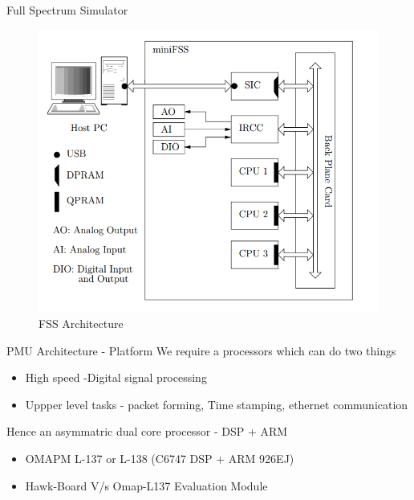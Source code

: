 \documentclass{beamer}
\begin{document}
\begin{frame}{Full Spectrum Simulator}
\begin{figure}
\includegraphics[scale=0.3]{fig/fss_arch2.png}
\caption{FSS Architecture}
\end{figure}
\end{frame}

\begin{frame}{PMU Architecture - Platform}
We require a processors which can do two things 
\begin{itemize}
\item High speed -Digital signal processing  
\item Uppper level tasks - packet forming, Time stamping, ethernet communication
\end{itemize}
Hence an asymmatric dual core processor - DSP + ARM
\begin{itemize}
\item OMAPM L-137 or L-138 (C6747 DSP + ARM 926EJ)
\item Hawk-Board V/s Omap-L137 Evaluation Module
\end{itemize}
\end{frame}
\end{document}
